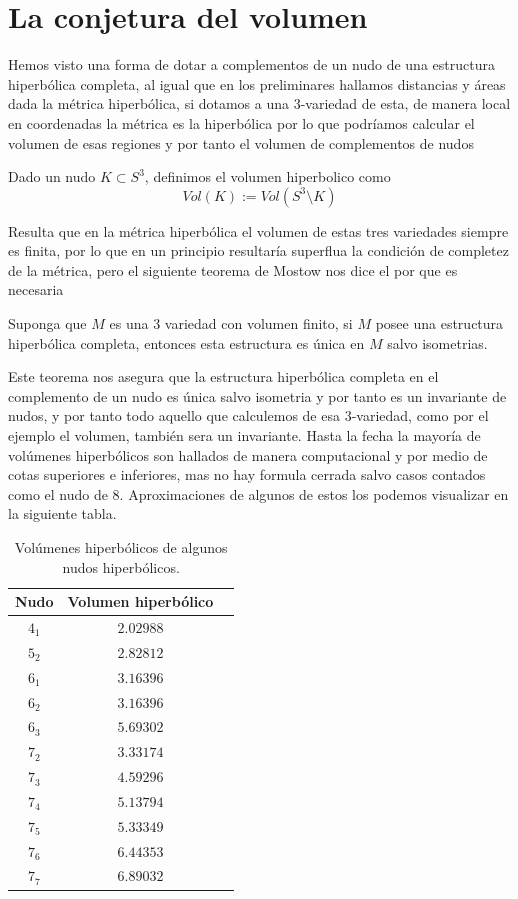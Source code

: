 \documentclass[12pt]{article}
\begin{document}
    \section{La conjetura del volumen}
    Hemos visto una forma de dotar a complementos de un nudo de una estructura hiperbólica completa, al igual que en los preliminares hallamos distancias y áreas dada la métrica hiperbólica, si dotamos a una 3-variedad de esta, de manera local en coordenadas la métrica es la hiperbólica por lo que podríamos calcular el volumen de esas regiones y por tanto el volumen de complementos de nudos
    \begin{definition}
        Dado un nudo $K\subset S^3$, definimos el volumen hiperbolico como
        $$Vol(K):=Vol(S^3\setminus K)$$
    \end{definition}
    Resulta que en la métrica hiperbólica el volumen de estas tres variedades siempre es finita, por lo que en un principio resultaría superflua la condición de completez de la métrica, pero el siguiente teorema de Mostow nos dice el por que es necesaria
    \begin{theorem}
        Suponga que $M$ es una 3 variedad con volumen finito, si $M$ posee una estructura hiperbólica completa, entonces esta estructura es única en $M$ salvo isometrias.
    \end{theorem}
    Este teorema nos asegura que la estructura hiperbólica completa en el complemento de un nudo es única salvo isometria y por tanto es un invariante de nudos, y por tanto todo aquello que calculemos de esa 3-variedad, como por el ejemplo el volumen, también sera un invariante. Hasta la fecha la mayoría de volúmenes hiperbólicos son hallados de manera computacional y por medio de cotas superiores e inferiores, mas no hay formula cerrada salvo casos contados como el nudo de $8$. Aproximaciones de algunos de estos los podemos visualizar en la siguiente tabla.
    \begin{table}[H]
\centering
\begin{tabular}{|c|c|c|}
\hline
\textbf{Nudo} & \textbf{Volumen hiperbólico} \\
\hline
$4_1$  & $2.02988$ \\
\hline
$5_2$  & $2.82812$ \\
\hline
$6_1$  & $3.16396$ \\
\hline
$6_2$   & $3.16396$ \\
\hline
$6_3$   & $5.69302$ \\
\hline
$7_2$   & $3.33174$ \\
\hline
$7_3$   & $4.59296$ \\
\hline
$7_4$   & $5.13794$ \\
\hline
$7_5$  & $5.33349$ \\
\hline
$7_6$   & $6.44353$ \\
\hline
$7_7$   & $6.89032$ \\
\hline
\end{tabular}
\caption{Volúmenes hiperbólicos de algunos nudos hiperbólicos.}
\end{table}
\end{document}
